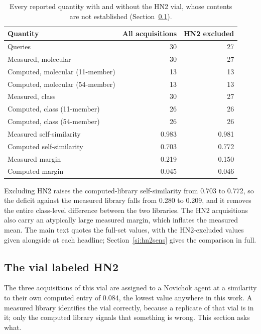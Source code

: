 \documentclass[11pt]{article}
\begin{document}
\begin{table}[htbp]
\centering
\caption{Every reported quantity with and without the HN2 vial, whose contents are not established (Section~\ref{si:hn2}).}
\label{tab:si-hn2}
\small
\begin{tabular}{lrr}
\toprule
Quantity & All acquisitions & HN2 excluded \\
\midrule
Queries & 30 & 27 \\
Measured, molecular & 30 & 27 \\
Computed, molecular (11-member) & 13 & 13 \\
Computed, molecular (54-member) & 13 & 13 \\
Measured, class & 30 & 27 \\
Computed, class (11-member) & 26 & 26 \\
Computed, class (54-member) & 26 & 26 \\
Measured self-similarity & 0.983 & 0.981 \\
Computed self-similarity & 0.703 & 0.772 \\
Measured margin & 0.219 & 0.150 \\
Computed margin & 0.045 & 0.046 \\
\bottomrule
\end{tabular}

\begin{flushleft}\footnotesize Excluding HN2 raises the computed-library self-similarity from 0.703 to 0.772, so the deficit against the measured library falls from 0.280 to 0.209, and it removes the entire class-level difference between the two libraries. The HN2 acquisitions also carry an atypically large measured margin, which inflates the measured mean. The main text quotes the full-set values, with the HN2-excluded values given alongside at each headline; Section~\ref{si:hn2sens} gives the comparison in full.\end{flushleft}
\end{table}

\subsection{The vial labeled HN2}
\label{si:hn2}

The three acquisitions of this vial are assigned to a Novichok agent at a similarity to
their own computed entry of 0.084, the lowest value anywhere in this work. A measured
library identifies the vial correctly, because a replicate of that vial is in it; only the
computed library signals that something is wrong. This section asks what.
\end{document}
